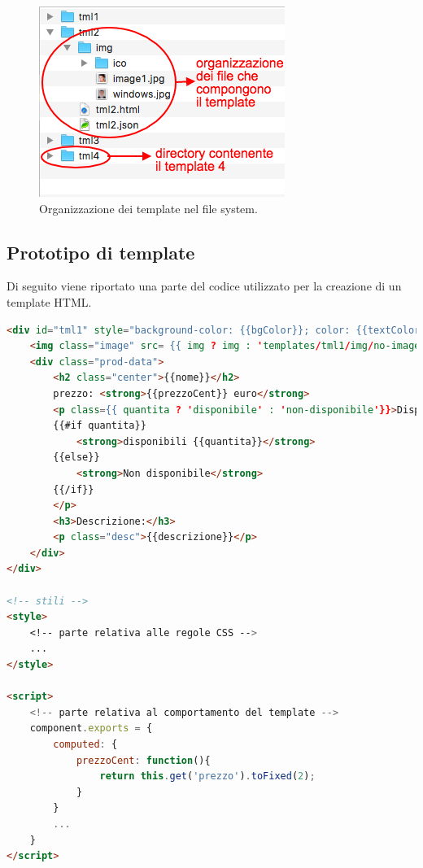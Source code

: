 \begin{figure}[htp]
	\centering
	\includegraphics[width=\textwidth/2]{../immagini/fileSistemTemplate}
	\caption{Organizzazione dei template nel file system.}
\end{figure}

\newpage

\subsection{Prototipo di template}
Di seguito viene riportato una parte del codice utilizzato per la creazione di un template HTML.\\

\begin{lstlisting}[language=HTML, caption= Esempio di template.]
<div id="tml1" style="background-color: {{bgColor}}; color: {{textColor}};">
	<img class="image" src= {{ img ? img : 'templates/tml1/img/no-image.png'}}>
	<div class="prod-data">
		<h2 class="center">{{nome}}</h2>
		prezzo: <strong>{{prezzoCent}} euro</strong>
		<p class={{ quantita ? 'disponibile' : 'non-disponibile'}}>Disponibilità: 
		{{#if quantita}}
			<strong>disponibili {{quantita}}</strong>
		{{else}}
			<strong>Non disponibile</strong>
		{{/if}}
		</p>
		<h3>Descrizione:</h3>
		<p class="desc">{{descrizione}}</p>
	</div>
</div>

<!-- stili -->
<style>
	<!-- parte relativa alle regole CSS -->
	...
</style>

<script>
	<!-- parte relativa al comportamento del template -->
	component.exports = {
		computed: {
			prezzoCent: function(){
				return this.get('prezzo').toFixed(2);
			}
		}
		...
	}
</script>
\end{lstlisting}

